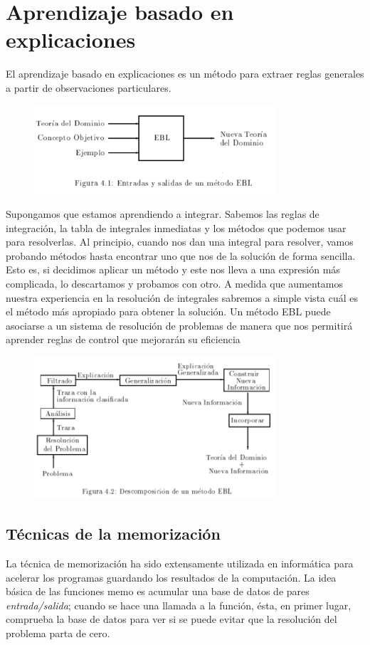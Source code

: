 \documentclass[12 pt, a4paper]{article}
\begin{document}
	 \section{Aprendizaje basado en explicaciones}
	 		El aprendizaje basado en explicaciones es un método para extraer reglas generales a partir de observaciones particulares.
	 			\begin{figure}[h]
					\centering
					\includegraphics[width=0.8\textwidth]{./section2/fig6.png}
				\end{figure}
	 		Supongamos que estamos aprendiendo a integrar. Sabemos las reglas de integración, la tabla de integrales inmediatas y los métodos que podemos usar para resolverlas. Al principio, cuando nos dan una integral para resolver, vamos probando métodos hasta encontrar uno que nos de la solución de forma sencilla. Esto es, si decidimos aplicar un método y este nos lleva a una expresión más complicada, lo descartamos y probamos con otro. A medida que aumentamos nuestra experiencia en la resolución de integrales sabremos a simple vista cuál es el método más apropiado para obtener la solución. Un método EBL puede asociarse a un sistema de resolución de problemas de manera que nos permitirá aprender reglas de control que mejorarán su eficiencia
	 			\begin{figure}[h]
					\centering
					\includegraphics[width=0.8\textwidth]{./section2/fig7.png}
				\end{figure}
	 		\subsection{Técnicas de la memorización}
	 		La técnica de memorización ha sido extensamente utilizada en informática para acelerar los programas guardando los resultados de la computación. La idea básica de las funciones memo es acumular una base de datos de pares \emph{entrada/salida}; cuando se hace una llamada a la función, ésta, en primer lugar, comprueba la base de datos para ver si se puede evitar que la resolución del problema parta de cero.
	 		
\end{document}
